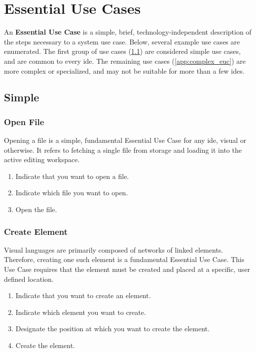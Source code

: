 \section{Essential Use Cases}
\label{app:euc}

An \textbf{Essential Use Case} is a simple, brief, technology-independent
description of the steps necessary to a system use case.
\cite{constantine1996} Below, several example use cases are enumerated. The
first group of use cases (\ref{app:simple_euc}) are considered simple use
cases, and are common to every \gls{ide}. The remaining use cases
(\ref{app:complex_euc}) are more complex or specialized, and may not be
suitable for more than a few \glspl{ide}.

\subsection{Simple}
\label{app:simple_euc}

\subsubsection{Open File}
\label{app:euc_open}

Opening a file is a simple, fundamental Essential Use Case for any
\gls{ide}, visual or otherwise. It refers to fetching a single file from
storage and loading it into the active editing workspace.

\begin{enumerate}
  \item Indicate that you want to open a file.
  \item Indicate which file you want to open.
  \item Open the file.
\end{enumerate}

\subsubsection{Create Element}
\label{app:euc_create}

Visual languages are primarily composed of networks of linked elements.
Therefore, creating one such element is a fundamental Essential Use Case.
This Use Case requires that the element must be created and placed at a
specific, user defined location.

\begin{enumerate}
  \item Indicate that you want to create an element.
  \item Indicate which element you want to create.
  \item Designate the position at which you want to create the element.
  \item Create the element.
\end{enumerate}

